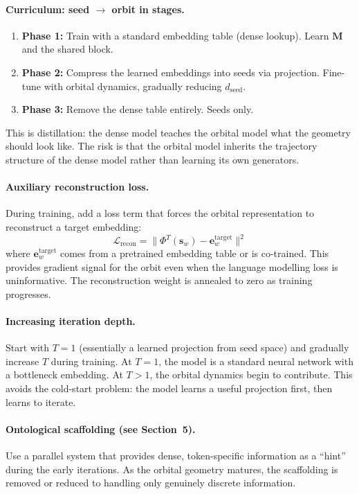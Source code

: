 \documentclass[11pt, a4paper]{article}
\newcommand{\M}{\mathbf{M}}
\newcommand{\s}{\mathbf{s}}
\newcommand{\calL}{\mathcal{L}}
\theoremstyle{remark}
\begin{document}
\paragraph{Curriculum: seed $\to$ orbit in stages.}
\begin{enumerate}[nosep]
    \item \textbf{Phase 1:} Train with a standard embedding table (dense lookup). Learn $\M$ and the shared block.
    \item \textbf{Phase 2:} Compress the learned embeddings into seeds via projection. Fine-tune with orbital dynamics, gradually reducing $d_{\text{seed}}$.
    \item \textbf{Phase 3:} Remove the dense table entirely. Seeds only.
\end{enumerate}
This is distillation: the dense model teaches the orbital model what the geometry should look like.
The risk is that the orbital model inherits the trajectory structure of the dense model rather than learning its own generators.

\paragraph{Auxiliary reconstruction loss.}
During training, add a loss term that forces the orbital representation to reconstruct a target embedding:
\[
    \calL_{\text{recon}} = \| \Phi^T(\s_w) - \mathbf{e}_w^{\text{target}} \|^2
\]
where $\mathbf{e}_w^{\text{target}}$ comes from a pretrained embedding table or is co-trained.
This provides gradient signal for the orbit even when the language modelling loss is uninformative.
The reconstruction weight is annealed to zero as training progresses.

\paragraph{Increasing iteration depth.}
Start with $T = 1$ (essentially a learned projection from seed space) and gradually increase $T$ during training.
At $T = 1$, the model is a standard neural network with a bottleneck embedding.
At $T > 1$, the orbital dynamics begin to contribute.
This avoids the cold-start problem: the model learns a useful projection first, then learns to iterate.

\paragraph{Ontological scaffolding (see Section~5).}
Use a parallel system that provides dense, token-specific information as a ``hint'' during the early iterations.
As the orbital geometry matures, the scaffolding is removed or reduced to handling only genuinely discrete information.
\end{document}
